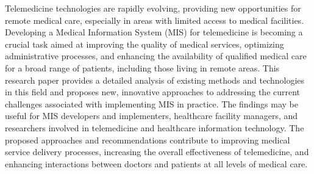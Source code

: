 Telemedicine technologies are rapidly evolving, providing new
opportunities for remote medical care, especially in areas with limited
access to medical facilities. Developing a Medical Information System
(MIS) for telemedicine is becoming a crucial task aimed at improving the
quality of medical services, optimizing administrative processes, and
enhancing the availability of qualified medical care for a broad range
of patients, including those living in remote areas. This research paper
provides a detailed analysis of existing methods and technologies in
this field and proposes new, innovative approaches to addressing the
current challenges associated with implementing MIS in practice. The
findings may be useful for MIS developers and implementers, healthcare
facility managers, and researchers involved in telemedicine and
healthcare information technology. The proposed approaches and
recommendations contribute to improving medical service delivery
processes, increasing the overall effectiveness of telemedicine, and
enhancing interactions between doctors and patients at all levels of
medical care.


